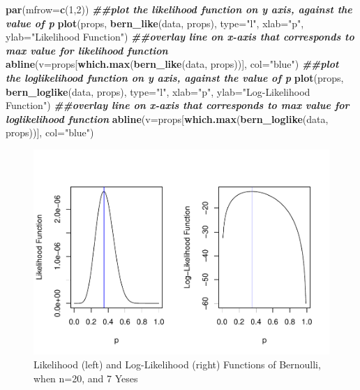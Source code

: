 \documentclass[
]{book}
\newenvironment{Shaded}{\begin{snugshade}}{\end{snugshade}}
\newcommand{\AttributeTok}[1]{\textcolor[rgb]{0.13,0.29,0.53}{#1}}
\newcommand{\DecValTok}[1]{\textcolor[rgb]{0.00,0.00,0.81}{#1}}
\newcommand{\DocumentationTok}[1]{\textcolor[rgb]{0.56,0.35,0.01}{\textbf{\textit{#1}}}}
\newcommand{\FunctionTok}[1]{\textcolor[rgb]{0.13,0.29,0.53}{\textbf{#1}}}
\newcommand{\NormalTok}[1]{#1}
\newcommand{\StringTok}[1]{\textcolor[rgb]{0.31,0.60,0.02}{#1}}
\begin{document}
\begin{Shaded}
\begin{Highlighting}[]
\FunctionTok{par}\NormalTok{(}\AttributeTok{mfrow=}\FunctionTok{c}\NormalTok{(}\DecValTok{1}\NormalTok{,}\DecValTok{2}\NormalTok{))}
\DocumentationTok{\#\#plot the likelihood function on y axis, against the value of p}
\FunctionTok{plot}\NormalTok{(props, }\FunctionTok{bern\_like}\NormalTok{(data, props), }\AttributeTok{type=}\StringTok{"l"}\NormalTok{, }\AttributeTok{xlab=}\StringTok{"p"}\NormalTok{, }\AttributeTok{ylab=}\StringTok{"Likelihood Function"}\NormalTok{)}
\DocumentationTok{\#\#overlay line on x{-}axis that corresponds to max value for likelihood function}
\FunctionTok{abline}\NormalTok{(}\AttributeTok{v=}\NormalTok{props[}\FunctionTok{which.max}\NormalTok{(}\FunctionTok{bern\_like}\NormalTok{(data, props))], }\AttributeTok{col=}\StringTok{"blue"}\NormalTok{)}
\DocumentationTok{\#\#plot the loglikelihood function on y axis, against the value of p}
\FunctionTok{plot}\NormalTok{(props, }\FunctionTok{bern\_loglike}\NormalTok{(data, props), }\AttributeTok{type=}\StringTok{"l"}\NormalTok{, }\AttributeTok{xlab=}\StringTok{"p"}\NormalTok{, }\AttributeTok{ylab=}\StringTok{"Log{-}Likelihood Function"}\NormalTok{)}
\DocumentationTok{\#\#overlay line on x{-}axis that corresponds to max value for loglikelihood function}
\FunctionTok{abline}\NormalTok{(}\AttributeTok{v=}\NormalTok{props[}\FunctionTok{which.max}\NormalTok{(}\FunctionTok{bern\_loglike}\NormalTok{(data, props))], }\AttributeTok{col=}\StringTok{"blue"}\NormalTok{)}
\end{Highlighting}
\end{Shaded}

\begin{figure}
\centering
\includegraphics{bookdown-demo_files/figure-latex/7-bernlikelihood-1.pdf}
\caption{\label{fig:7-bernlikelihood}Likelihood (left) and Log-Likelihood (right) Functions of Bernoulli, when n=20, and 7 Yeses}
\end{figure}
\end{document}
